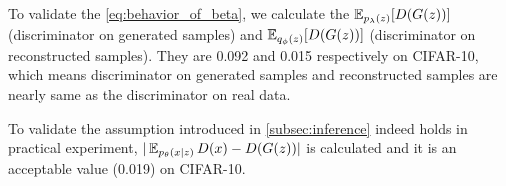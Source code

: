 To validate the \cref{eq:behavior_of_beta}, we calculate the $\operatorname{\mathbb{E}}_{p_\lambda(z)}[ D(G(z))]$ (discriminator on generated samples) and $\operatorname{\mathbb{E}}_{q_\phi(z)}[ D(G(z))]$ (discriminator on reconstructed samples). They are 0.092 and 0.015 respectively on CIFAR-10, which means discriminator on generated samples and reconstructed samples are nearly same as the discriminator on real data. 

To validate the assumption introduced in \cref{subsec:inference} indeed holds in practical experiment, $|\operatorname{\mathbb{E}}_{p_\theta(x|z)}D(x) - D(G(z))|$ is calculated and it is an acceptable value (0.019) on CIFAR-10. 





